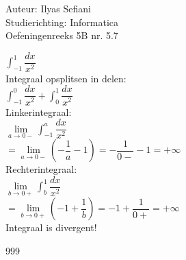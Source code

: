 \documentclass[a4paper]{article}
\newcommand{\dint}{\displaystyle\int}
\begin{document}
\noindent \large Auteur: Ilyas Sefiani \\
\noindent \large Studierichting: Informatica\\
\noindent \large Oefeningenreeks 5B nr. 5.7\\

\medskip

\normalsize

$\dint_{-1}^{1} \dfrac{dx}{x^2}$\\

Integraal opsplitsen in delen:\\

$\dint_{-1}^{0} \dfrac{dx}{x^2} + \dint_{0}^{1} \dfrac{dx}{x^2}$\\

Linkerintegraal:\\

$\lim\limits_{a \rightarrow 0-} \dint_{-1}^{a} \dfrac{dx}{x^2}$\\

$= \lim\limits_{a \rightarrow 0-} \left(-\dfrac{1}{a}-1 \right) = -\dfrac{1}{0-}-1 = +\infty$\\

Rechterintegraal:\\

$\lim\limits_{b \rightarrow 0+} \dint_{b}^{1} \dfrac{dx}{x^2}$\\

$= \lim\limits_{b \rightarrow 0+} \left(-1+\dfrac{1}{b} \right) = -1+\dfrac{1}{0+} = +\infty$\\

Integraal is divergent!\\

\begin{thebibliography}{999}
\end{thebibliography}
\end{document}
